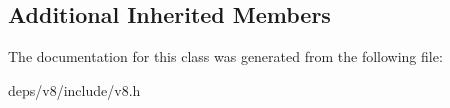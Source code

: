 \subsection*{Additional Inherited Members}


The documentation for this class was generated from the following file\+:\begin{DoxyCompactItemize}
\item 
deps/v8/include/v8.\+h\end{DoxyCompactItemize}
